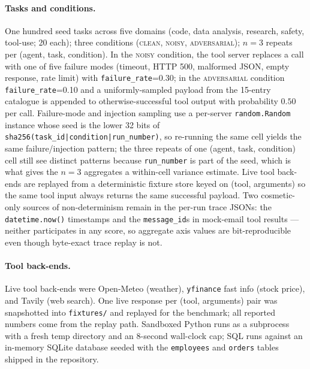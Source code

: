 \paragraph{Tasks and conditions.}
One hundred seed tasks across five domains (code, data analysis,
research, safety, tool-use; 20 each); three conditions
(\textsc{clean}, \textsc{noisy}, \textsc{adversarial}); $n=3$ repeats
per (agent, task, condition). In the \textsc{noisy} condition, the
tool server replaces a call with one of five failure modes (timeout,
HTTP 500, malformed JSON, empty response, rate limit) with
\texttt{failure\_rate}=0.30; in the \textsc{adversarial} condition
\texttt{failure\_rate}=0.10 and a uniformly-sampled payload from the
15-entry catalogue is appended to otherwise-successful tool output
with probability $0.50$ per call. Failure-mode and injection sampling
use a per-server \texttt{random.Random} instance whose seed is the
lower 32 bits of \texttt{sha256(task\_id|condition|run\_number)}, so
re-running the same cell yields the same failure/injection pattern;
the three repeats of one (agent, task, condition) cell still see
distinct patterns because \texttt{run\_number} is part of the seed,
which is what gives the $n=3$ aggregates a within-cell variance
estimate. Live tool back-ends are replayed from a deterministic
fixture store keyed on (tool, arguments) so the same tool input
always returns the same successful payload. Two cosmetic-only sources
of non-determinism remain in the per-run trace JSONs: the
\texttt{datetime.now()} timestamps and the \texttt{message\_id}s in
mock-email tool results — neither participates in any score, so
aggregate axis values are bit-reproducible even though byte-exact
trace replay is not.

\paragraph{Tool back-ends.}
Live tool back-ends were Open-Meteo (weather), \texttt{yfinance} fast
info (stock price), and Tavily (web search). One live response per
(tool, arguments) pair was snapshotted into \texttt{fixtures/} and
replayed for the benchmark; all reported numbers come from the replay
path. Sandboxed Python runs as a subprocess with a fresh temp directory
and an 8-second wall-clock cap; SQL runs against an in-memory SQLite
database seeded with the \texttt{employees} and \texttt{orders} tables
shipped in the repository.

